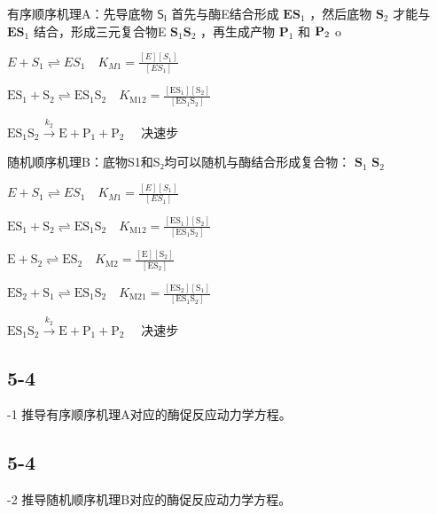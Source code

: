 有序顺序机理A：先导底物 $\mathsf { S } _ { \mathsf { I } }$ 首先与酶E结合形成 $\mathbf { E S } _ { 1 }$ ，然后底物 $\mathbf { S } _ { 2 }$ 才能与 $\mathbf { E S } _ { 1 }$ 结合，形成三元复合物E $\mathbf { S } _ { 1 } \mathbf { S } _ { 2 }$ ，再生成产物 $\mathbf { P } _ { 1 }$ 和 ${ \bf P } _ { 2 }$ o

$
E + S _ {1} \rightleftharpoons E S _ {1} \quad K _ {M 1} = \frac {[ E ] [ S _ {1} ]}{[ E S _ {1} ]}
$

$
\mathrm{ES} _ {1} + \mathrm{S} _ {2} \rightleftharpoons \mathrm{ES} _ {1} \mathrm{S} _ {2} \quad K _ {\mathrm{M} 1 2} = \frac {[ \mathrm{ES} _ {1} ] [ \mathrm{S} _ {2} ]}{[ \mathrm{ES} _ {1} \mathrm{S} _ {2} ]}
$

$
\mathrm{ES} _ {1} \mathrm{S} _ {2} \xrightarrow {k _ {2}} \mathrm{E} + \mathrm{P} _ {1} + \mathrm{P} _ {2} \quad \text {   决速步   }
$

随机顺序机理B：底物S1和S₂均可以随机与酶结合形成复合物： $\mathbf { S } _ { 1 }$ $\mathbf { S } _ { 2 }$

$
E + S _ {1} \rightleftharpoons E S _ {1} \quad K _ {M 1} = \frac {[ E ] [ S _ {1} ]}{[ E S _ {1} ]}
$

$
\mathrm{ES} _ {1} + \mathrm{S} _ {2} \rightleftharpoons \mathrm{ES} _ {1} \mathrm{S} _ {2} \quad K _ {\mathrm{M} 1 2} = \frac {[ \mathrm{ES} _ {1} ] [ \mathrm{S} _ {2} ]}{[ \mathrm{ES} _ {1} \mathrm{S} _ {2} ]}
$

$
\mathrm{E} + \mathrm{S} _ {2} \rightleftharpoons \mathrm{ES} _ {2} \quad K _ {\mathrm{M} 2} = \frac {[ \mathrm{E} ] [ \mathrm{S} _ {2} ]}{[ \mathrm{ES} _ {2} ]}
$

$
\mathrm{ES} _ {2} + \mathrm{S} _ {1} \rightleftharpoons \mathrm{ES} _ {1} \mathrm{S} _ {2} \quad K _ {\mathrm{M} 2 1} = \frac {[ \mathrm{ES} _ {2} ] [ \mathrm{S} _ {1} ]}{[ \mathrm{ES} _ {1} \mathrm{S} _ {2} ]}
$

$
\mathrm{ES} _ {1} \mathrm{S} _ {2} \xrightarrow {k _ {2}} \mathrm{E} + \mathrm{P} _ {1} + \mathrm{P} _ {2} \quad \text {   决速步   }
$

\subsection*{5-4}
-1 推导有序顺序机理A对应的酶促反应动力学方程。

\subsection*{5-4}
-2 推导随机顺序机理B对应的酶促反应动力学方程。

